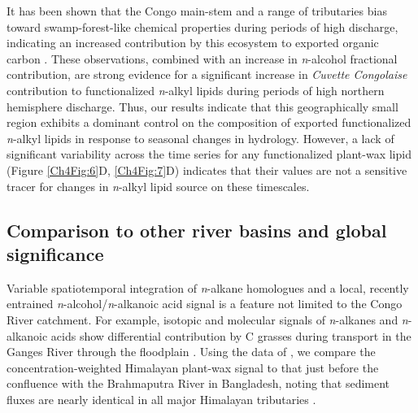It has been shown that the Congo main-stem and a range of tributaries bias toward swamp-forest-like chemical properties during periods of high discharge, indicating an increased contribution by this ecosystem to exported organic carbon \citep{Wang:2013js,Mann:2014jx}. These observations, combined with an increase in \textit{n}-alcohol fractional contribution, are strong evidence for a significant increase in \textit{Cuvette Congolaise} contribution to functionalized \textit{n}-alkyl lipids during periods of high northern hemisphere discharge. Thus, our results indicate that this geographically small region \citep[\SI{4}{\%} coverage;][]{Mayaux:2004uw} exhibits a dominant control on the composition of exported functionalized \textit{n}-alkyl lipids in response to seasonal changes in hydrology. However, a lack of significant  variability across the time series for any functionalized plant-wax lipid (Figure \ref{Ch4Fig:6}D, \ref{Ch4Fig:7}D) indicates that their  values are not a sensitive tracer for changes in \textit{n}-alkyl lipid source on these timescales.

\subsection{Comparison to other river basins and global significance}

Variable spatiotemporal integration of \textit{n}-alkane homologues and a local, recently entrained \textit{n}-alcohol/\textit{n}-alkanoic acid signal is a feature not limited to the Congo River catchment. For example, isotopic and molecular signals of \textit{n}-alkanes and \textit{n}-alkanoic acids show differential contribution by C grasses during transport in the Ganges River through the floodplain \citep{Galy:2011ix}. Using the data of \citet{Galy:2011ix}, we compare the concentration-weighted Himalayan plant-wax signal to that just before the confluence with the Brahmaputra River in Bangladesh, noting that sediment fluxes are nearly identical in all major Himalayan tributaries \citep{Andermann:2012br}.

